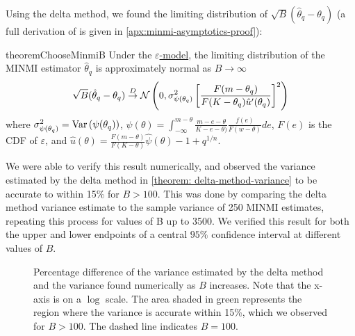 Using the delta method, we found the limiting distribution of $\sqrt{B}(\hat\theta_q - \theta_q)$ (a full derivation of is given in \autoref{apx:minmi-asymptotics-proof}):
\begin{restatable}{theorem}{ChooseMinmiB}\label{theorem: delta-method-variance}
    Under the \hyperref[model: measurement-error]{$\varepsilon$-model}, the limiting distribution of the MINMI estimator $\hat\theta_q$ is approximately normal as $B \rightarrow \infty$
    \[
        \sqrt{B}(\hat\theta_q - \theta_q) \stackrel{D}{\rightarrow} \mathcal{N} \left(0, \sigma^2_{\psi(\theta_q)} \left[ \frac{F(m-\theta_q)}{F(K-\theta_q)\hat{u}^\prime(\theta_q)} \right]^2 \right)
    \] where $\sigma^2_{\psi(\theta_q)} = \mathrm{Var}\left(\psi(\theta_q)\right)$, $\psi(\theta) =  \int^{m-\theta}_{-\infty} \frac{m - e - \theta}{K - e - \theta) } \frac{f(e)}{F(w-\theta)} de$, $F(e)$ is the CDF of $\varepsilon$, and $\hat{u}(\theta) = \frac{F(m-\theta)}{F(K-\theta)} \hat{\psi}(\theta) - 1 + q^{1/n}$.
\end{restatable}

We were able to verify this result numerically, and observed the variance estimated by the delta method in \autoref{theorem: delta-method-variance} to be accurate to within 15\% for $B > 100$. This was done by comparing the delta method variance estimate to the sample variance of 250 MINMI estimates, repeating this process for values of B up to 3500. We verified this result for both the upper and lower endpoints of a central $95\%$ confidence interval at different values of $B$.
\begin{figure}[ht]
    \centering
    
    \caption{Percentage difference of the variance estimated by the delta method and the variance found numerically as $B$ increases. Note that the x-axis is on a $\log$ scale. The area shaded in green represents the region where the variance is accurate within 15\%, which we observed for $B > 100$. The dashed line indicates $B=100$.}
    \label{fig: minmi-delta-method-variance}
\end{figure}

